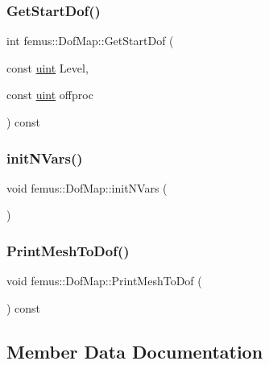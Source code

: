 \subsubsection{\texorpdfstring{Get\+Start\+Dof()}{GetStartDof()}}
{\footnotesize\ttfamily int femus\+::\+Dof\+Map\+::\+Get\+Start\+Dof (\begin{DoxyParamCaption}\item[{const \mbox{\hyperlink{_typedefs_8hpp_a91ad9478d81a7aaf2593e8d9c3d06a14}{uint}}}]{Level,  }\item[{const \mbox{\hyperlink{_typedefs_8hpp_a91ad9478d81a7aaf2593e8d9c3d06a14}{uint}}}]{offproc }\end{DoxyParamCaption}) const\hspace{0.3cm}{\ttfamily [inline]}}

\mbox{\label{classfemus_1_1_dof_map_aa84b5b38fd73a56018a66dac26de385d}} 
\subsubsection{\texorpdfstring{init\+N\+Vars()}{initNVars()}}
{\footnotesize\ttfamily void femus\+::\+Dof\+Map\+::init\+N\+Vars (\begin{DoxyParamCaption}{ }\end{DoxyParamCaption})}

\mbox{\label{classfemus_1_1_dof_map_a801bae5752dca9dc1cd5b717e26de5ad}} 
\subsubsection{\texorpdfstring{Print\+Mesh\+To\+Dof()}{PrintMeshToDof()}}
{\footnotesize\ttfamily void femus\+::\+Dof\+Map\+::\+Print\+Mesh\+To\+Dof (\begin{DoxyParamCaption}{ }\end{DoxyParamCaption}) const}



\subsection{Member Data Documentation}
\mbox{\label{classfemus_1_1_dof_map_a6a0a1e270ab5c9250e0385d6a0555cbb}} 

